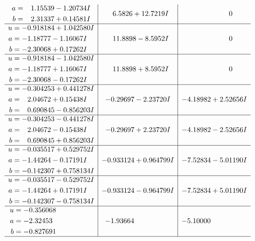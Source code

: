 \documentclass[1p]{elsarticle_modified}
\theoremstyle{definition}
\begin{document}
$$\begin{array}{c|c|c}
\begin{aligned}
a &= \phantom{-}1.15539 - 1.20734 I \\
b &= \phantom{-}2.31337 + 0.14581 I\end{aligned}
 & \phantom{-}6.5826 + 12.7219 I & \phantom{-0.000000 } 0 \\ \hline\begin{aligned}
u &= -0.918184 + 1.042580 I \\
a &= -1.18777 - 1.16067 I \\
b &= -2.30068 + 0.17262 I\end{aligned}
 & \phantom{-}11.8898 - 8.5952 I & \phantom{-0.000000 } 0 \\ \hline\begin{aligned}
u &= -0.918184 - 1.042580 I \\
a &= -1.18777 + 1.16067 I \\
b &= -2.30068 - 0.17262 I\end{aligned}
 & \phantom{-}11.8898 + 8.5952 I & \phantom{-0.000000 } 0 \\ \hline\begin{aligned}
u &= -0.304253 + 0.441278 I \\
a &= \phantom{-}2.04672 + 0.15438 I \\
b &= \phantom{-}0.690845 - 0.856203 I\end{aligned}
 & -0.29697 - 2.23720 I & -4.18982 + 2.52656 I \\ \hline\begin{aligned}
u &= -0.304253 - 0.441278 I \\
a &= \phantom{-}2.04672 - 0.15438 I \\
b &= \phantom{-}0.690845 + 0.856203 I\end{aligned}
 & -0.29697 + 2.23720 I & -4.18982 - 2.52656 I \\ \hline\begin{aligned}
u &= -0.035517 + 0.529752 I \\
a &= -1.44264 - 0.17191 I \\
b &= -0.142307 + 0.758134 I\end{aligned}
 & -0.933124 + 0.964799 I & -7.52834 - 5.01190 I \\ \hline\begin{aligned}
u &= -0.035517 - 0.529752 I \\
a &= -1.44264 + 0.17191 I \\
b &= -0.142307 - 0.758134 I\end{aligned}
 & -0.933124 - 0.964799 I & -7.52834 + 5.01190 I \\ \hline\begin{aligned}
u &= -0.356068\phantom{ +0.000000I} \\
a &= -2.32453\phantom{ +0.000000I} \\
b &= -0.827691\phantom{ +0.000000I}\end{aligned}
 & -1.93664\phantom{ +0.000000I} & -5.10000\phantom{ +0.000000I}\\
 \hline 
 \end{array}$$\newpage\newpage\renewcommand{\arraystretch}{1}
\end{document}

